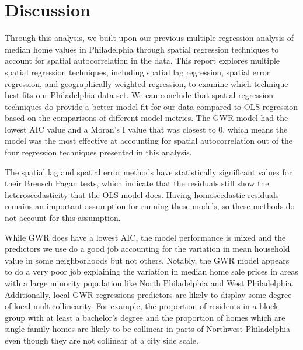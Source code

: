 \documentclass[
]{article}
\begin{document}
\hypertarget{discussion}{%
\section{Discussion}\label{discussion}}

Through this analysis, we built upon our previous multiple regression
analysis of median home values in Philadelphia through spatial
regression techniques to account for spatial autocorrelation in the
data. This report explores multiple spatial regression techniques,
including spatial lag regression, spatial error regression, and
geographically weighted regression, to examine which technique best fits
our Philadelphia data set. We can conclude that spatial regression
techniques do provide a better model fit for our data compared to OLS
regression based on the comparisons of different model metrics. The GWR
model had the lowest AIC value and a Moran's I value that was closest to
0, which means the model was the most effective at accounting for
spatial autocorrelation out of the four regression techniques presented
in this analysis.

The spatial lag and spatial error methods have statistically significant
values for their Breusch Pagan tests, which indicate that the residuals
still show the heteroscedasticity that the OLS model does. Having
homoscedastic residuals remains an important assumption for running
these models, so these methods do not account for this assumption.

While GWR does have a lowest AIC, the model performance is mixed and the
predictors we use do a good job accounting for the variation in mean
household value in some neighborhoods but not others. Notably, the GWR
model appears to do a very poor job explaining the variation in median
home sale prices in areas with a large minority population like North
Philadelphia and West Philadelphia. Additionally, local GWR regressions
predictors are likely to display some degree of local multicollinearity.
For example, the proportion of residents in a block group with at least
a bachelor's degree and the proportion of homes which are single family
homes are likely to be collinear in parts of Northwest Philadelphia even
though they are not collinear at a city side scale.
\end{document}
